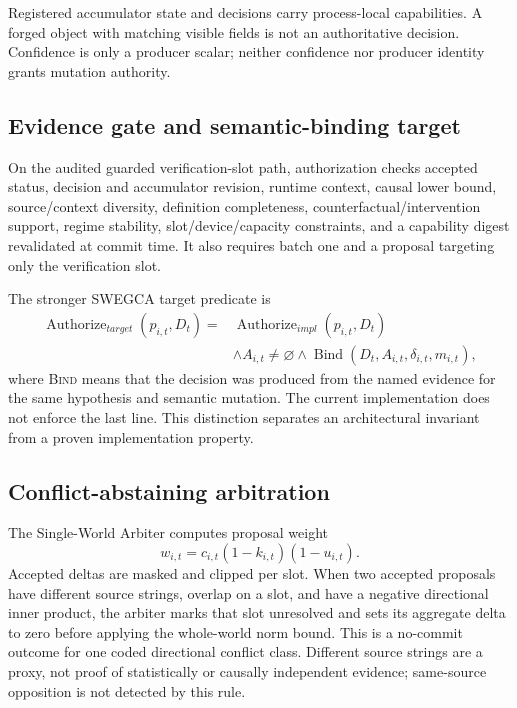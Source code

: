 \documentclass[10pt]{article}
\newcommand{\swegca}{\textsc{SWEGCA}}
\begin{document}
Registered accumulator state and decisions carry process-local capabilities. A forged object with matching visible fields is not an authoritative decision. Confidence is only a producer scalar; neither confidence nor producer identity grants mutation authority.

\subsection{Evidence gate and semantic-binding target}
\label{sec:binding}

On the audited guarded verification-slot path, authorization checks accepted status, decision and accumulator revision, runtime context, causal lower bound, source/context diversity, definition completeness, counterfactual/intervention support, regime stability, slot/device/capacity constraints, and a capability digest revalidated at commit time. It also requires batch one and a proposal targeting only the verification slot.

The stronger \swegca{} target predicate is
\begin{align}
\operatorname{Authorize}_{target}(p_{i,t},D_t)={}&\operatorname{Authorize}_{impl}(p_{i,t},D_t)\\
&\land A_{i,t}\neq\varnothing
\land \operatorname{Bind}(D_t,A_{i,t},\delta_{i,t},m_{i,t}),
\end{align}
where \textsc{Bind} means that the decision was produced from the named evidence for the same hypothesis and semantic mutation. The current implementation does not enforce the last line. This distinction separates an architectural invariant from a proven implementation property.

\subsection{Conflict-abstaining arbitration}

The Single-World Arbiter computes proposal weight
\begin{equation}
  w_{i,t}=c_{i,t}(1-k_{i,t})(1-u_{i,t}).
\end{equation}
Accepted deltas are masked and clipped per slot. When two accepted proposals have different source strings, overlap on a slot, and have a negative directional inner product, the arbiter marks that slot unresolved and sets its aggregate delta to zero before applying the whole-world norm bound. This is a no-commit outcome for one coded directional conflict class. Different source strings are a proxy, not proof of statistically or causally independent evidence; same-source opposition is not detected by this rule.
\end{document}
